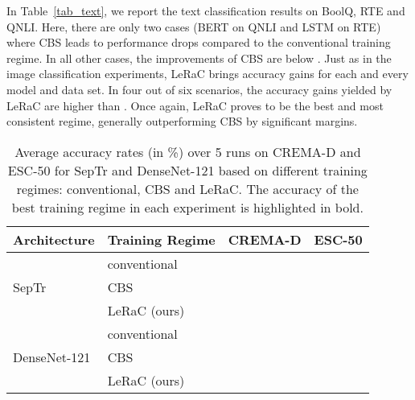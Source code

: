 \documentclass[10pt,twocolumn,letterpaper]{article}
\begin{document}
In Table~\ref{tab_text}, we report the text classification results on BoolQ, RTE and QNLI. Here, there are only two cases (BERT on QNLI and LSTM on RTE) where CBS leads to performance drops compared to the conventional training regime. In all other cases, the improvements of CBS are below . Just as in the image classification experiments, LeRaC brings accuracy gains for each and every model and data set. In four out of six scenarios, the accuracy gains yielded by LeRaC are higher than . Once again, LeRaC proves to be the best and most consistent regime, generally outperforming CBS by significant margins.

\begin{table}
  \small{
  \setlength\tabcolsep{3.3pt}
  \begin{center}
  \begin{tabular}{llcc}
    \toprule
    Architecture  & Training Regime     & CREMA-D     & ESC-50 \\
    \midrule
         & conventional                   &       &    \\
    SepTr     & CBS \cite{Sinha-NIPS-2020}                &       &    \\
         & LeRaC (ours)        &       &    \\
    \midrule
         & conventional             &      &  \\
    DenseNet-121     & CBS \cite{Sinha-NIPS-2020}          &      & \\
         & LeRaC (ours)  &      & \\
    \bottomrule
  \end{tabular}
    \end{center}
    }
      \vspace{-0.6cm}
    \caption{Average accuracy rates (in \%) over 5 runs on CREMA-D and ESC-50 for SepTr and DenseNet-121 based on different training regimes: conventional, CBS \cite{Sinha-NIPS-2020} and LeRaC. The accuracy of the best training regime in each experiment is highlighted in bold.\vspace{-0.4cm}}
  \label{tab_audio}
\end{table}
\end{document}
